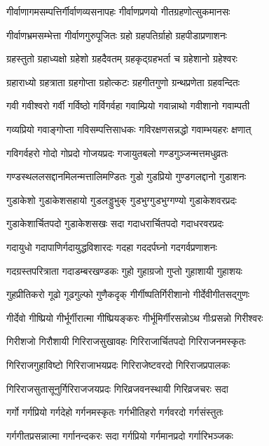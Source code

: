 \twolineshloka
{गीर्वाणागमसम्पत्तिर्गीर्वाणव्यसनापहः}%
{गीर्वाणप्रणयो गीतग्रहणोत्सुकमानसः}%

\twolineshloka
{गीर्वाणभ्रमसम्भेत्ता गीर्वाणगुरुपूजितः}%
{ग्रहो ग्रहपतिर्ग्राहो ग्रहपीडाप्रणाशनः}%

\twolineshloka
{ग्रहस्तुतो ग्रहाध्यक्षो ग्रहेशो ग्रहदैवतम्}%
{ग्रहकृद्ग्रहभर्ता च ग्रहेशानो ग्रहेश्वरः}%

\twolineshloka
{ग्रहाराध्यो ग्रहत्राता ग्रहगोप्ता ग्रहोत्कटः}%
{ग्रहगीतगुणो ग्रन्थप्रणेता ग्रहवन्दितः}%

\twolineshloka
{गवी गवीश्वरो गर्वी गर्विष्ठो गर्विगर्वहा}%
{गवाम्प्रियो गवान्नाथो गवीशानो गवाम्पती}%

\twolineshloka
{गव्यप्रियो गवाङ्गोप्ता गविसम्पत्तिसाधकः}%
{गविरक्षणसन्नद्धो गवाम्भयहरः क्षणात्}%

\twolineshloka
{गविगर्वहरो गोदो गोप्रदो गोजयप्रदः}%
{गजायुतबलो गण्डगुञ्जन्मत्तमधुव्रतः}%

\twolineshloka
{गण्डस्थललसद्दानमिलन्मत्तालिमण्डितः}%
{गुडो गुडप्रियो गुण्डगलद्दानो गुडाशनः}%

\twolineshloka
{गुडाकेशो गुडाकेशसहायो गुडलड्डुभुक्}%
{गुडभुग्गुडभुग्गण्यो गुडाकेशवरप्रदः}%

\twolineshloka
{गुडाकेशार्चितपदो गुडाकेशसखः सदा}%
{गदाधरार्चितपदो गदाधरवरप्रदः}%

\twolineshloka
{गदायुधो गदापाणिर्गदायुद्धविशारदः}%
{गदहा गददर्पघ्नो गदगर्वप्रणाशनः}%

\twolineshloka
{गदग्रस्तपरित्राता गदाडम्बरखण्डकः}%
{गुहो गुहाग्रजो गुप्तो गुहाशायी गुहाशयः}%

\twolineshloka
{गुहप्रीतिकरो गूढो गूढगुल्फो गुणैकदृक्}%
{गीर्गीष्पतिर्गिरीशानो गीर्देवीगीतसद्गुणः}%

\twolineshloka
{गीर्देवो गीष्प्रियो गीर्भूर्गीरात्मा गीष्प्रियङ्करः}%
{गीर्भूमिर्गीरसन्नोऽथ गीःप्रसन्नो गिरीश्वरः}%

\twolineshloka
{गिरीशजो गिरौशायी गिरिराजसुखावहः}%
{गिरिराजार्चितपदो गिरिराजनमस्कृतः}%

\twolineshloka
{गिरिराजगुहाविष्टो गिरिराजाभयप्रदः}%
{गिरिराजेष्टवरदो गिरिराजप्रपालकः}%

\twolineshloka
{गिरिराजसुतासूनुर्गिरिराजजयप्रदः}%
{गिरिव्रजवनस्थायी गिरिव्रजचरः सदा}%

\twolineshloka
{गर्गो गर्गप्रियो गर्गदेहो गर्गनमस्कृतः}%
{गर्गभीतिहरो गर्गवरदो गर्गसंस्तुतः}%

\twolineshloka
{गर्गगीतप्रसन्नात्मा गर्गानन्दकरः सदा}%
{गर्गप्रियो गर्गमानप्रदो गर्गारिभञ्जकः}%

